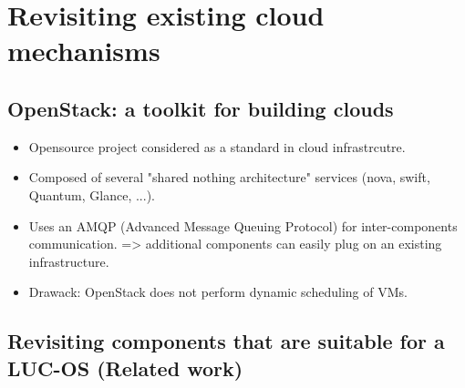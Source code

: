 \section{Revisiting existing cloud mechanisms}
\label{sec:integration}

\subsection{OpenStack: a toolkit for building clouds}

\begin{itemize}
	
	\item Opensource project considered as a standard in cloud infrastrcutre.

	\item Composed of several "shared nothing architecture" services (nova, 
	swift, Quantum, Glance, ...).

	\item Uses an AMQP (Advanced Message Queuing Protocol) for inter-components 
	communication. => additional components can easily plug on an existing
	infrastructure.

	\item Drawack: OpenStack does not perform dynamic scheduling of VMs.

\end{itemize}


\subsection{Revisiting components that are suitable for a LUC-OS (Related work)}


